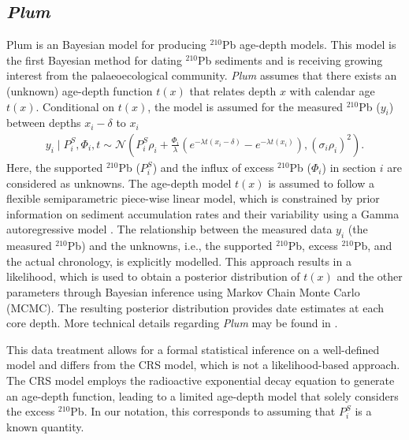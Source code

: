 \documentclass [10pt] {article}
\newcommand{\ac}{\color{red} }  %
\newcommand{\ca}{\color{black}} %
\begin{document}


\subsection{\textit{Plum}}

Plum \citep{Aquino2018} is an Bayesian model for producing $^{210}$Pb age-depth models.
This model is the first Bayesian method for dating $^{210}$Pb sediments and is receiving growing interest from the palaeoecological community.%
\textit{Plum} assumes that there exists an (unknown) age-depth function $t(x)$ that relates depth $x$ with calendar age $t(x)$. 
Conditional on $t(x)$, the model is assumed for the measured $^{210}$Pb ($y_i$) between depths $x_i - \delta$ to $x_i$
\begin{eqnarray}
y_i \mid P^S_i, \Phi_i, t \sim \mathcal{N} \left(P^S_i \rho_i +\frac{\Phi_i}{\lambda} \left( e^{-\lambda t(x_i-\delta)} - e^{-\lambda t(x_i)} \right), (\sigma_i\rho_i)^2 \right). 
\end{eqnarray}
Here, the supported $^{210}$Pb ($P_i^S$) and the influx of excess $^{210}$Pb ($\Phi_i$) in section $i$ are considered as unknowns. The age-depth model $t(x)$ is assumed to follow a flexible semiparametric piece-wise linear model, which is constrained by prior information on sediment accumulation rates and their variability using a Gamma autoregressive model \citep{Blaauw2011}. The relationship between the measured data $y_i$ (the measured $^{210}$Pb) and the unknowns, i.e., the supported $^{210}$Pb, excess $^{210}$Pb, and the actual chronology, is explicitly modelled. This approach results in a likelihood, which is used to obtain a posterior distribution of $t(x)$ and the other parameters through Bayesian inference using Markov Chain Monte Carlo (MCMC). The resulting posterior distribution provides date estimates at each core depth. More technical details regarding \textit{Plum} may be found in \citep{Aquino2018}.

This data treatment allows for a formal statistical inference on a well-defined model and differs from the CRS model, which is not a likelihood-based approach. The CRS model employs the radioactive exponential decay equation to generate an age-depth function, leading to a limited age-depth model that solely considers the excess $^{210}$Pb. In our notation, this corresponds to assuming that $P_i^S$ is a known quantity. 
\end{document}
